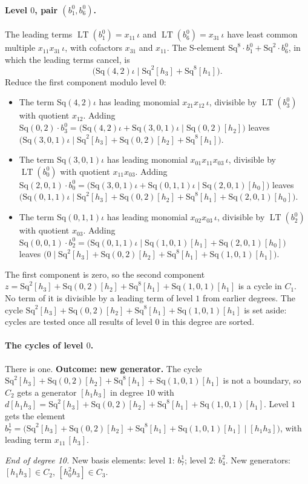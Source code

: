 \documentclass[11pt]{article}
\newcommand{\Sq}{\mathrm{Sq}}
\DeclareMathOperator{\LT}{LT}
\begin{document}
\paragraph{Level $0$, pair $(b^{0}_{1}, b^{0}_{6})$.} The leading terms $\LT(b^{0}_{1}) = x_{11}\,\iota$ and $\LT(b^{0}_{6}) = x_{31}\,\iota$ have least common multiple $x_{11}x_{31}\,\iota$, with cofactors $x_{31}$ and $x_{11}$. The S-element $\Sq^{8}\cdot b^{0}_{1} + \Sq^{2}\cdot b^{0}_{6}$, in which the leading terms cancel, is
\[\bigl(\Sq(4,2)\iota \;\big|\; \Sq^{2}[h_3] + \Sq^{8}[h_1]\bigr).\]
Reduce the first component modulo level $0$:
\begin{itemize}
\item The term $\Sq(4,2)\iota$ has leading monomial $x_{21}x_{12}\,\iota$, divisible by $\LT(b^{0}_{3})$ with quotient $x_{12}$. Adding $\Sq(0,2)\cdot b^{0}_{3} = \bigl(\Sq(4,2)\iota + \Sq(3,0,1)\iota \;\big|\; \Sq(0,2)[h_2]\bigr)$ leaves $\bigl(\Sq(3,0,1)\iota \;\big|\; \Sq^{2}[h_3] + \Sq(0,2)[h_2] + \Sq^{8}[h_1]\bigr)$.
\item The term $\Sq(3,0,1)\iota$ has leading monomial $x_{01}x_{11}x_{03}\,\iota$, divisible by $\LT(b^{0}_{0})$ with quotient $x_{11}x_{03}$. Adding $\Sq(2,0,1)\cdot b^{0}_{0} = \bigl(\Sq(3,0,1)\iota + \Sq(0,1,1)\iota \;\big|\; \Sq(2,0,1)[h_0]\bigr)$ leaves $\bigl(\Sq(0,1,1)\iota \;\big|\; \Sq^{2}[h_3] + \Sq(0,2)[h_2] + \Sq^{8}[h_1] + \Sq(2,0,1)[h_0]\bigr)$.
\item The term $\Sq(0,1,1)\iota$ has leading monomial $x_{02}x_{03}\,\iota$, divisible by $\LT(b^{0}_{2})$ with quotient $x_{03}$. Adding $\Sq(0,0,1)\cdot b^{0}_{2} = \bigl(\Sq(0,1,1)\iota \;\big|\; \Sq(1,0,1)[h_1] + \Sq(2,0,1)[h_0]\bigr)$ leaves $\bigl(0 \;\big|\; \Sq^{2}[h_3] + \Sq(0,2)[h_2] + \Sq^{8}[h_1] + \Sq(1,0,1)[h_1]\bigr)$.
\end{itemize}
The first component is zero, so the second component $z = \Sq^{2}[h_3] + \Sq(0,2)[h_2] + \Sq^{8}[h_1] + \Sq(1,0,1)[h_1]$ is a cycle in $C_{1}$.
No term of it is divisible by a leading term of level $1$ from earlier degrees.
The cycle $\Sq^{2}[h_3] + \Sq(0,2)[h_2] + \Sq^{8}[h_1] + \Sq(1,0,1)[h_1]$ is set aside: cycles are tested once all results of level $0$ in this degree are sorted.
\medskip
\paragraph{The cycles of level $0$.} There is one.
\textbf{Outcome: new generator.} The cycle $\Sq^{2}[h_3] + \Sq(0,2)[h_2] + \Sq^{8}[h_1] + \Sq(1,0,1)[h_1]$ is not a boundary, so $C_{2}$ gets a generator $[h_1h_3]$ in degree $10$ with $d[h_1h_3] = \Sq^{2}[h_3] + \Sq(0,2)[h_2] + \Sq^{8}[h_1] + \Sq(1,0,1)[h_1]$.
Level $1$ gets the element $b^{1}_{7} = \bigl(\Sq^{2}[h_3] + \Sq(0,2)[h_2] + \Sq^{8}[h_1] + \Sq(1,0,1)[h_1] \;\big|\; [h_1h_3]\bigr)$, with leading term $x_{11}\,[h_3]$.
\medskip
\par\noindent\emph{End of degree 10.} New basis elements: level $1$: $b^{1}_{7}$; level $2$: $b^{2}_{4}$. New generators: $[h_1h_3]\in C_{2}$, $[h_0^2h_3]\in C_{3}$.
\end{document}
